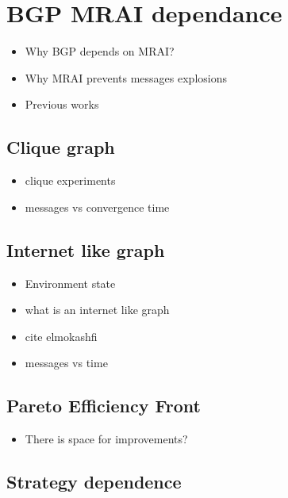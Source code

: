 \chapter{BGP MRAI dependance}
\label{cha:bgp_mrai_experiments}

\begin{itemize}
    \item Why BGP depends on MRAI?
    \item Why MRAI prevents messages explosions
    \item Previous works
\end{itemize}

\section{Clique graph}
\label{sec:bgp_mrai_clique}

\begin{itemize}
    \item clique experiments
    \item messages vs convergence time
\end{itemize}

\section{Internet like graph}
\label{sec:bgp_mrai_internet_like}

\begin{itemize}
    \item Environment state
    \item what is an internet like graph
    \item cite elmokashfi
    \item messages vs time
\end{itemize}

\section{Pareto Efficiency Front}
\label{sec:bgp_mrai_pareto_front}

\begin{itemize}
    \item There is space for improvements?
\end{itemize}

\section{Strategy dependence}
\label{sec:bgp_mrai_strategy_dependance}


